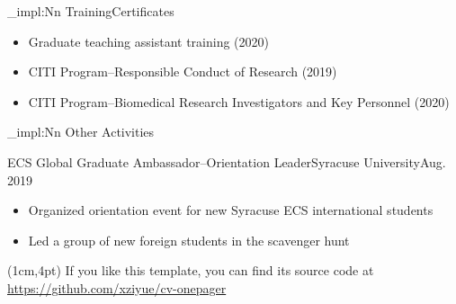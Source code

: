 \documentclass[10pt]{article}
\newcommand{\cvhead}[1]{\cvhead_impl:Nn \Large {#1}}
\begin{document}
{\begin{minipage}[t]{0.48\linewidth}
\cvhead{Training\raisebox{2pt}{/}Certificates}
\begin{itemize}
\item Graduate teaching assistant training (2020)
\item CITI Program--Responsible Conduct of Research (2019)
\item CITI Program--Biomedical Research Investigators and Key Personnel
(2020)
\end{itemize}

\cvhead{Other Activities}
\begin{triplehead}{ECS Global Graduate Ambassador--Orientation Leader}{Syracuse University}{Aug. 2019}
\begin{itemize}
\item Organized orientation event for new Syracuse ECS international students
\item Led a group of new foreign students in the scavenger hunt
\end{itemize}
\end{triplehead}


\end{minipage}
}

\begin{textblock*}{\linewidth}(1cm,4pt)
\tiny If you like this template, you can find its source code at \href{https://github.com/xziyue/cv-onepager}{https://github.com/xziyue/cv-onepager}
\end{textblock*}
\end{document}
